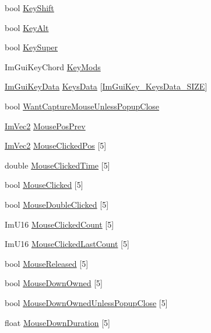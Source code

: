 \begin{DoxyCompactItemize}
bool \hyperlink{structImGuiIO_a3c7642214f88862af5b8467f98ac35c9}{Key\+Shift}
\item 
bool \hyperlink{structImGuiIO_a1e64ef08a4448a2cac874496130992cb}{Key\+Alt}
\item 
bool \hyperlink{structImGuiIO_afda9e11e21b7ba21573671c38d9f4a81}{Key\+Super}
\item 
Im\+Gui\+Key\+Chord \hyperlink{structImGuiIO_a77133a351ecaf34ea5df82866690dcaa}{Key\+Mods}
\item 
\hyperlink{structImGuiKeyData}{Im\+Gui\+Key\+Data} \hyperlink{structImGuiIO_a6efeb8f2a11a463a0c7b1f8401532e88}{Keys\+Data} \mbox{[}\hyperlink{imgui_8h_aa22ffe36b188427d712447ec465203d4ae037761d4aeb8d78ce9e4684151c825b}{Im\+Gui\+Key\+\_\+\+Keys\+Data\+\_\+\+S\+I\+ZE}\mbox{]}
\item 
bool \hyperlink{structImGuiIO_a088bdc608b0c695eb3a8fac4a06e859b}{Want\+Capture\+Mouse\+Unless\+Popup\+Close}
\item 
\hyperlink{structImVec2}{Im\+Vec2} \hyperlink{structImGuiIO_a0fa6601a709eb9e34460e6abc7e77ad7}{Mouse\+Pos\+Prev}
\item 
\hyperlink{structImVec2}{Im\+Vec2} \hyperlink{structImGuiIO_a23c9c6c48a51774fee36b7f0bb75d331}{Mouse\+Clicked\+Pos} \mbox{[}5\mbox{]}
\item 
double \hyperlink{structImGuiIO_afc5a5a5250fdee3c558f45c4f0268308}{Mouse\+Clicked\+Time} \mbox{[}5\mbox{]}
\item 
bool \hyperlink{structImGuiIO_a8655587202ff9001e5b0ccc6ade42d93}{Mouse\+Clicked} \mbox{[}5\mbox{]}
\item 
bool \hyperlink{structImGuiIO_a8bc01048733dc554de3d03f40f57b9ca}{Mouse\+Double\+Clicked} \mbox{[}5\mbox{]}
\item 
Im\+U16 \hyperlink{structImGuiIO_ac3e700b171e730f8e527b4fa08cf6fad}{Mouse\+Clicked\+Count} \mbox{[}5\mbox{]}
\item 
Im\+U16 \hyperlink{structImGuiIO_aef8407268836888e9954c86afcc0b42a}{Mouse\+Clicked\+Last\+Count} \mbox{[}5\mbox{]}
\item 
bool \hyperlink{structImGuiIO_a3a2e7d52289eecfdbe8571e034e41b53}{Mouse\+Released} \mbox{[}5\mbox{]}
\item 
bool \hyperlink{structImGuiIO_a682f98d817f99058136cb47cf8a9bcc3}{Mouse\+Down\+Owned} \mbox{[}5\mbox{]}
\item 
bool \hyperlink{structImGuiIO_a5ed7eb38ec2cb214981671f1bc48fb38}{Mouse\+Down\+Owned\+Unless\+Popup\+Close} \mbox{[}5\mbox{]}
\item 
float \hyperlink{structImGuiIO_ab464bf317051bbdf1c93ab36802fe3b7}{Mouse\+Down\+Duration} \mbox{[}5\mbox{]}

\end{DoxyCompactItemize}
